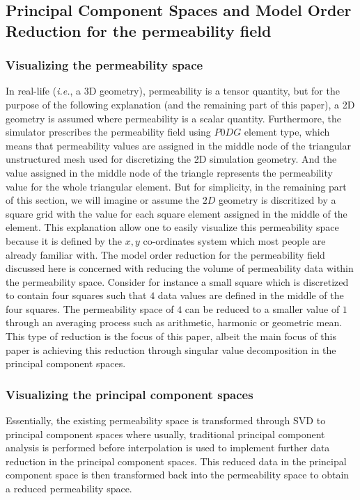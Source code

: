 \documentclass[preprint,12pt]{elsarticle}
\begin{document}
\subsection{Principal Component Spaces and Model Order Reduction for the permeability field}\label{subsection:pcspaces}

\subsubsection{Visualizing the permeability space}\label{subsubsection:visualization_permspace}
In real-life ({\it i.e.}, a 3D geometry), permeability is a tensor quantity, but for the purpose of the following explanation (and the remaining part of this paper), a 2D geometry is assumed where permeability is a scalar quantity. Furthermore, the simulator prescribes the permeability field using $P0DG$ element type, which means that permeability values are assigned in the middle node of the triangular unstructured mesh used for discretizing the 2D simulation geometry. And the value assigned in the middle node of the triangle represents the permeability value for the whole triangular element. But for simplicity, in the remaining part of this section, we will imagine or assume the $2D$ geometry is discritized by a square grid with the value for each square element assigned in the middle of the element. This explanation allow one to easily visualize this permeability space because it is defined by the $x,y$ co-ordinates  system which most people are already familiar with. The model order reduction for the permeability field discussed here is concerned with reducing the volume of permeability data within the permeability space. Consider for instance a small square which is discretized to contain four squares such that $4$ data values are defined in the middle of the four squares. The permeability space of $4$ can be reduced to a smaller value of $1$ through an averaging process such as arithmetic, harmonic or geometric mean. This type of reduction is the focus of this paper, albeit the main focus of this paper is achieving this reduction through singular value decomposition in the principal component spaces. 

\subsubsection{Visualizing the principal component spaces}\label{subsubsection:visualization_pcspaces}
Essentially, the existing permeability space is transformed through SVD to principal component spaces where usually, traditional principal component analysis is performed before interpolation is used to implement further data reduction in the principal component spaces. This reduced data in the principal component space is then transformed back into the permeability space to obtain a reduced permeability space.
\end{document}
